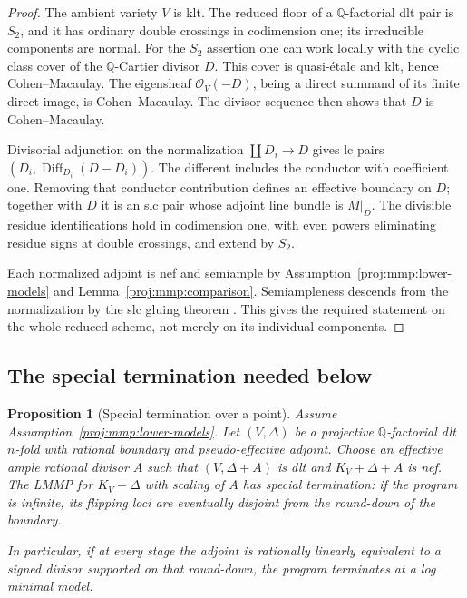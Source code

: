 \documentclass[11pt,letterpaper]{article}
\newtheorem{proposition}[theorem]{Proposition}
\theoremstyle{definition}
\theoremstyle{remark}
\begin{document}
\begin{proof}
The ambient variety \(V\) is klt. The reduced floor of a
\(\mathbb{Q}\)-factorial dlt pair is \(S_2\), and it has ordinary double
crossings in codimension one; its irreducible components are normal.
For the \(S_2\) assertion one can work locally with the cyclic
class cover of the \(\mathbb{Q}\)-Cartier divisor \(D\). This cover is
quasi-\'etale and klt, hence Cohen--Macaulay. The eigensheaf
\(\mathcal{O}_V(-D)\), being a direct summand of its finite direct image,
is Cohen--Macaulay. The divisor sequence then shows that \(D\)
is Cohen--Macaulay.

Divisorial adjunction on the normalization
\(\coprod D_i\to D\) gives lc pairs
\((D_i,\operatorname{Diff}_{D_i}(D-D_i))\).
The different includes the conductor with coefficient one.
Removing that conductor contribution defines an effective boundary
on \(D\); together with \(D\) it is an slc pair whose adjoint
line bundle is \(M|_D\). The divisible residue identifications
hold in codimension one, with even powers eliminating residue
signs at double crossings, and extend by \(S_2\).

Each normalized adjoint is nef and semiample by
Assumption~\ref{proj:mmp:lower-models} and
Lemma~\ref{proj:mmp:comparison}.
Semiampleness descends from the normalization by the slc gluing
theorem \cite[Theorem~1.5, equivalently Theorem~4.3]
{FujinoGongyoPluricanonical}. This gives the required statement on the
whole reduced scheme, not merely on its individual components.
\end{proof}

\subsection{The special termination needed below}

\begin{proposition}[Special termination over a point]
\label{proj:prop:special-termination}
Assume Assumption~\ref{proj:mmp:lower-models}.
Let \((V,\Delta)\) be a projective \(\mathbb{Q}\)-factorial dlt
\(n\)-fold with rational boundary and pseudo-effective adjoint.
Choose an effective ample rational divisor \(A\) such that
\((V,\Delta+A)\) is dlt and \(K_V+\Delta+A\) is nef.
The LMMP for \(K_V+\Delta\) with scaling of \(A\) has special
termination: if the program is infinite, its flipping loci
are eventually disjoint from the round-down of the boundary.

In particular, if at every stage the adjoint is rationally linearly
equivalent to a signed divisor supported on that round-down, the
program terminates at a log minimal model.
\end{proposition}
\end{document}
